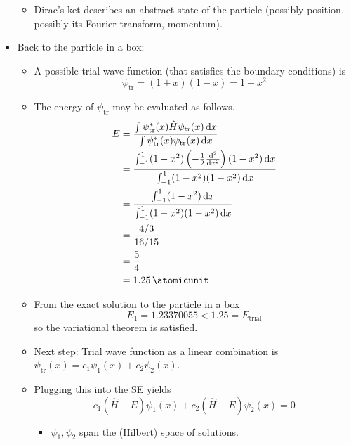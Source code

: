 \documentclass[../notes.tex]{subfiles}
\begin{document}
\begin{itemize}
    \begin{itemize}
        \item Dirac's ket describes an abstract state of the particle (possibly position, possibly its Fourier transform, momentum).
    \end{itemize}
    \item Back to the particle in a box:
    \begin{itemize}
        \item A possible trial wave function (that satisfies the boundary conditions) is
        \begin{equation*}
            \psi_\text{tr} = (1+x)(1-x) = 1-x^2
        \end{equation*}
        \item The energy of $\psi_\text{tr}$ may be evaluated as follows.
        \begin{align*}
            E &= \frac{\int\psi_\text{tr}^*(x)\hat{H}\psi_\text{tr}(x)\dd{x}}{\int\psi_\text{tr}^*(x)\psi_\text{tr}(x)\dd{x}}\\
            &= \frac{\int_{-1}^1(1-x^2)\left( -\frac{1}{2}\dv[2]{x} \right)(1-x^2)\dd{x}}{\int_{-1}^1(1-x^2)(1-x^2)\dd{x}}\\
            &= \frac{\int_{-1}^1(1-x^2)\dd{x}}{\int_{-1}^1(1-x^2)(1-x^2)\dd{x}}\\
            &= \frac{4/3}{16/15}\\
            &= \frac{5}{4}\\
            &= \SI{1.25}{\atomicunit}
        \end{align*}
        \item From the exact solution to the particle in a box
        \begin{equation*}
            E_1 = 1.23370055 < 1.25 = E_\text{trial}
        \end{equation*}
        so the variational theorem is satisfied.
        \item Next step: Trial wave function as a linear combination is $\psi_\text{tr}(x)=c_1\psi_1(x)+c_2\psi_2(x)$.
        \item Plugging this into the SE yields
        \begin{equation*}
            c_1(\hat{H}-E)\psi_1(x)+c_2(\hat{H}-E)\psi_2(x) = 0
        \end{equation*}
        \begin{itemize}
            \item $\psi_1,\psi_2$ span the (Hilbert) space of solutions.
        \end{itemize}

\end{itemize}
\end{itemize}
\end{document}
